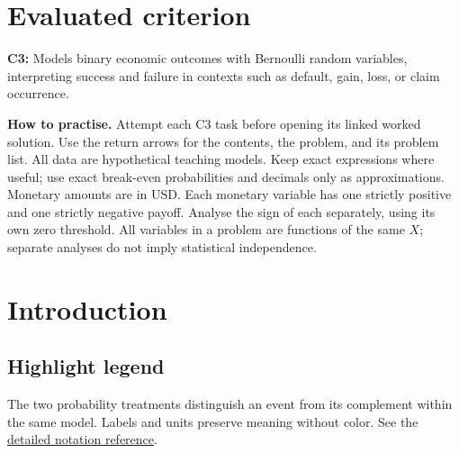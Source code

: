 \maketitle
\setcounter{tocdepth}{1}
\setcounter{secnumdepth}{2}
\label{toc}
\tableofcontents
\section*{Evaluated criterion}
\textbf{C3:} Models binary economic outcomes with Bernoulli random variables, interpreting success and failure in contexts such as default, gain, loss, or claim occurrence.

\textbf{How to practise.} Attempt each C3 task before opening its linked worked solution.
Use the return arrows for the contents, the problem, and its problem list.
All data are hypothetical teaching models. Keep exact expressions where useful;
use exact break-even probabilities and decimals only as approximations. Monetary amounts are in USD.
Each monetary variable has one strictly positive and one strictly negative payoff.
Analyse the sign of each  separately, using its own zero threshold.
All variables in a problem are functions of the same $X$; separate analyses do
not imply statistical independence.


\clearpage\section{Introduction}\label{sec:t2-c3-introduction}
\subsection*{Highlight legend}
\label{tab:highlight-legend}

The two probability treatments distinguish an event from its complement within
the same model. Labels and units preserve meaning without color.
See the \hyperref[tab:notation-reference]{detailed notation reference}.

